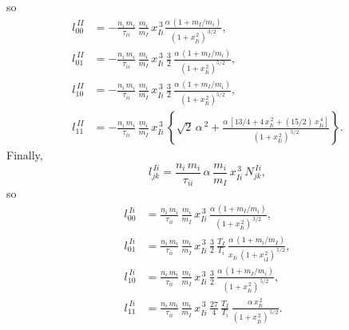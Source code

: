 \documentclass[notitlepage,12pt]{article}
\begin{document}
so
\begin{align}
l^{\,II}_{00} &= -\frac{n_i\,m_i}{\tau_{ii}}\,\frac{m_i}{m_I}\,x_{Ii}^{\,3}\frac{\alpha\,(1+m_I/m_i)}{(1+x_{Ii}^{\,2})^{\,3/2}},\\[0.5ex]
l^{\,II}_{01}&= -\frac{n_i\,m_i}{\tau_{ii}}\,\frac{m_i}{m_I}\,x_{Ii}^{\,3}\,\frac{3}{2}\,\frac{\alpha\,(1+m_I/m_i)}{(1+x_{Ii}^{\,2})^{5/2}},\\[0.5ex]
l^{\,II}_{10}&= -\frac{n_i\,m_i}{\tau_{ii}}\,\frac{m_i}{m_I}\,x_{Ii}^{\,3}\,\frac{3}{2}\,\frac{\alpha\,(1+m_I/m_i)}{(1+x_{Ii}^{\,2})^{5/2}},\\[0.5ex]
l^{\,II}_{11}& = -\frac{n_i\,m_i}{\tau_{ii}}\,\frac{m_i}{m_I}\,x_{Ii}^{\,3}\,\left\{\sqrt{2}\,\alpha^{\,2}+
\frac{\alpha\,[13/4+4\,x_{Ii}^{\,2}+(15/2)\,x_{Ii}^{\,4}]}{(1+x_{Ii}^{\,2})^{\,5/2}}
\right\}.
\end{align}
Finally, 
\begin{equation}
l_{jk}^{\,Ii} = \frac{n_i\,m_i}{\tau_{ii}}\,\alpha\,\frac{m_i}{m_I}\,x_{Ii}^{\,3}\,N^{\,Ii}_{jk},
\end{equation}
so 
\begin{align}
l^{\,Ii}_{00} &= \frac{n_i\,m_i}{\tau_{ii}}\,\frac{m_i}{m_I}\,x_{Ii}^{\,3}\,\frac{\alpha\,(1+m_I/m_i)}{(1+x_{Ii}^{\,2})^{\,3/2}},\\[0.5ex]
l^{\,Ii}_{01}&= \frac{n_i\,m_i}{\tau_{ii}}\,\frac{m_i}{m_I}\,x_{Ii}^{\,3}\,\frac{3}{2}\,\frac{T_I}{T_i}\,\frac{\alpha\,(1+m_i/m_I)}{x_{Ii}\,(1+x_{iI}^{\,2})^{\,5/2}},\\[0.5ex]
l^{\,Ii}_{10}&= \frac{n_i\,m_i}{\tau_{ii}}\,\frac{m_i}{m_I}\,x_{Ii}^{\,3}\,\frac{3}{2}\,\frac{\alpha\,(1+m_I/m_i)}{(1+x_{Ii}^{\,2})^{\,5/2}},\\[0.5ex]
l^{\,Ii}_{11}& = \frac{n_i\,m_i}{\tau_{ii}}\,\frac{m_i}{m_I}\,x_{Ii}^{\,3}\,\frac{27}{4}\,\frac{T_I}{T_i}\,\frac{\alpha\,x_{Ii}^{\,2}}{(1+x_{Ii}^{\,2})^{\,5/2}}.
\end{align}
\end{document}
